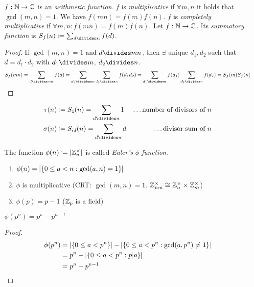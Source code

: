 \documentclass[NumTh.tex]{subfiles}
\begin{document}
\begin{defi}
  $f: \mathbb{N} \to \mathbb{C}$ is an \emph{arithmetic function}.
  $f$ is \emph{multiplicative} if $\forall m,n $ it holds that $\gcd(m,n) = 1$. We have $f(mn) = f(m) f(n)$.
  $f$ is \emph{completely multiplicative} if $\forall m,n: f(mn) = f(m) f(n)$.
  Let $f: \mathbb{N} \to \mathbb{C}$. Its \emph{summatory function} is $S_{f}(n) \coloneq \sum_{d\divides n} f(d)$.
\end{defi}

\begin{proof}
  If $\gcd(m,n) = 1$ and $d\divides mn$, then $\exists$ unique $d_1,d_2$ such that $d = d_1 \cdot d_2$ with $d_1 \divides  m$, $d_2\divides n$.
  \[S_f (mn) = \sum_{d\divides mn} f(d) = \sum_{d_1\divides m} \sum_{d_2\divides n} f(d_1 d_2) = \sum_{d_1\divides m} f(d_1) \sum_{d_2\divides n} f(d_2) = S_f(m) S_f(n)\]
\end{proof}

\begin{ex}
  \begin{align*}
    \tau(n) &\coloneq S_1(n) = \sum_{d\divides n} 1 &\text{\dots number of divisors of $n$} \\
    \sigma(n) &\coloneq S_{id}(n) = \sum_{d\divides n} d &\text{\dots divisor sum of $n$}
  \end{align*}
\end{ex}

\begin{defi}
  The function $\phi(n) \coloneq \left\vert{\mathbb{Z}_n^\times}\right\vert$ is called \emph{Euler's $\phi$-function}.
\end{defi}

\begin{rem}
  \begin{enumerate}
    \item $\phi(n) = \left\vert{\left\{ 0 \leq a < n : \gcd(a,n) = 1\right\}}\right\vert$
    \item $\phi$ is multiplicative (CRT: $\gcd(m,n) = 1$. $\mathbb{Z}_{nm}^\times \cong \mathbb{Z}_n^\times \times \mathbb{Z}_m^\times$)
    \item $\phi(p) = p - 1$ ($\mathbb{Z}_p$ is a field)
  \end{enumerate}
\end{rem}

\begin{lemma}
  $\phi(p^n) = p^n - p^{n-1}$
\end{lemma}

\begin{proof}
  \begin{align*}
    \phi(p^n) &= \left\vert{\left\{0 \leq a < p^n\right\}}\right\vert - \left\vert{\left\{0 \leq a < p^n : \gcd(a,p^n) \neq 1\right\}}\right\vert \\
              &= p^n - \left\vert{\left\{0 \leq a < p^n : p|a\right\}}\right\vert \\
              &= p^n - p^{n-1}
  \end{align*}
\end{proof}
\end{document}

